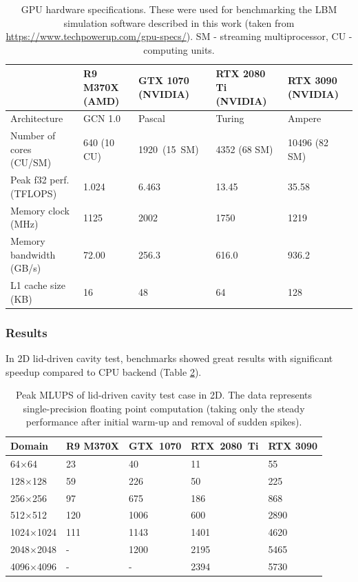 \begin{table}[!ht]
	\centering
	\begin{tabular}{ |p{5.3cm}||p{2.3cm}|p{2.5cm}|p{2.5cm}|p{2.8cm}| }
		\hline
		& R9 M370X \newline(AMD) & GTX 1070 \newline(NVIDIA) & RTX 2080 Ti \newline(NVIDIA) & RTX 3090 \newline(NVIDIA) \\
		\hline
		Architecture   & GCN 1.0 & Pascal  & Turing &  Ampere  \\
		Number of cores (CU/SM)   & 640 (10 CU) & 1920~(15~SM)   &  4352 (68 SM) &  10496 (82 SM) \\
		Peak f32 perf. (TFLOPS)   & 1.024  & 6.463  & 13.45 &  35.58 \\
		Memory clock (MHz)   & 1125  & 2002   & 1750 &   1219 \\
		Memory bandwidth (GB/s)   & 72.00  & 256.3   & 616.0 &   936.2 \\
		L1 cache size (KB)   & 16  & 48   & 64 &   128 \\
		\hline
	\end{tabular}
	\caption{GPU hardware specifications. These were used for benchmarking the LBM simulation software described in this work (taken from \url{https://www.techpowerup.com/gpu-specs/}). SM - streaming multiprocessor, CU - computing units.}
	\label{tab:gpus}
\end{table}

\subsubsection{Results}

In 2D lid-driven cavity test, benchmarks showed great results with significant speedup compared to CPU backend (Table \ref{tab:lid-mlups-all-2d}).

\begin{table}[!ht]
	\centering
	\begin{tabular}{ |p{3cm}||p{2.2cm}|p{2.2cm}|p{2.4cm}|p{2.2cm}|  }
		\hline
		Domain & R9 M370X & GTX~1070 & RTX~2080~Ti & RTX 3090 \\
		\hline
		64$\times$64   & 23 & 40  & 11  & 55  \\
		128$\times$128   & 59 & 226  & 50   & 225  \\
		256$\times$256   & 97 & 675  & 186   & 868  \\
		512$\times$512   & 120 & 1006  & 600   & 2890  \\
		1024$\times$1024   & 111 & 1143   & 1401   & 4620  \\
		2048$\times$2048   & - & 1200  & 2195  & 5465  \\
		4096$\times$4096   & - & -  & 2394  & 5730  \\
		\hline
	\end{tabular}
	\caption{Peak MLUPS of lid-driven cavity test case in 2D. The data represents single-precision floating point computation (taking only the steady performance after initial warm-up and removal of sudden spikes).}
	\label{tab:lid-mlups-all-2d}
\end{table}

